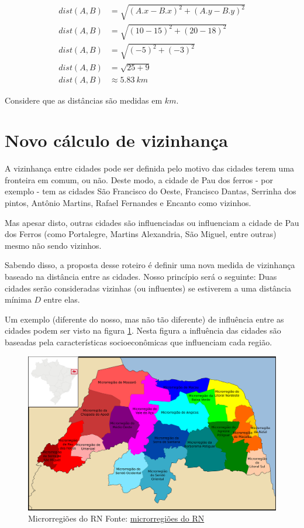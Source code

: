 \documentclass[12pt,a4paper]{article}
\begin{document}
\begin{align}
    dist(A,B) &= \sqrt{(A.x - B.x)^2 + (A.y - B.y)^2}\\
    dist(A,B) &= \sqrt{(10 - 15)^2 + (20 - 18)^2}\\
    dist(A,B) &= \sqrt{(-5)^2 + (-3)^2}\\
    dist(A,B) &= \sqrt{25 + 9}\\
    dist(A,B) &\approx 5.83\ km
\end{align}

Considere que as distâncias são medidas em $km$.

\section*{Novo cálculo de vizinhança}

A vizinhança entre cidades pode ser definida pelo motivo das cidades terem uma fronteira em comum, ou não. Deste modo, a cidade de Pau dos ferros - por exemplo - tem as cidades São Francisco do Oeste, Francisco Dantas, Serrinha dos pintos, Antônio Martins, Rafael Fernandes e Encanto como vizinhos.

Mas apesar disto, outras cidades são influenciadas ou influenciam a cidade de Pau dos Ferros (como Portalegre, Martins Alexandria, São Miguel, entre outras) mesmo não sendo vizinhos.

Sabendo disso, a proposta desse roteiro é definir uma nova medida de vizinhança baseado na distância entre as cidades. Nosso princípio será o seguinte: Duas cidades serão consideradas vizinhas (ou influentes) se estiverem a uma distância mínima $D$ entre elas.

Um exemplo (diferente do nosso, mas não tão diferente) de influência entre as cidades podem ser visto na figura \ref{fig:fig1}. Nesta figura a influência das cidades são baseadas pela características socioeconômicas que influenciam cada região.

\begin{figure}[H]
    \centering
    \includegraphics[width=0.8\linewidth]{altoOeste.jpeg}
    \caption{Microrregiões do RN Fonte: \href{https://pt.wikipedia.org/wiki/lista_de_mesorregi\%C3\%B5es_e_microrregi\%C3\%B5es_do_Rio_Grande_do_Norte}{microrregiões do RN}} 
    \label{fig:fig1}
\end{figure}
\end{document}
